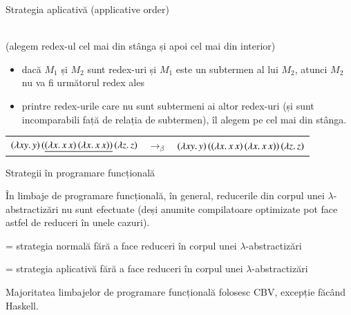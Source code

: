 \documentclass[xcolor=pdftex,romanian,colorlinks]{beamer}
\begin{document}
\begin{frame}[fragile]{Strategia aplicativă (applicative order)}

 \\
(alegem redex-ul  cel mai din stânga și apoi cel mai din interior)

\begin{itemize}
	\item dacă $M_1$ și $M_2$ sunt redex-uri  și $M_1$ este un subtermen al lui $M_2$, atunci $M_2$ {\color{False} nu} va fi următorul redex ales
	\item printre redex-urile care nu sunt subtermeni ai altor redex-uri (și sunt incomparabili față de relația de subtermen), îl alegem pe cel mai din stânga.
\end{itemize}

{\footnotesize
\begin{center}
\begin{tabular}{rcl} 
$(\lambda xy.\,y)\, (\underline{(\lambda x.\,x\, x)\, (\lambda x.\,x\, x))}\, (\lambda z.\,z)$ & $\rightarrow_\beta$ &  $(\lambda xy.\,y)\, ((\lambda x.\,x\, x)\, (\lambda x.\,x\, x))\, (\lambda z.\,z)$ \\
\end{tabular}
\end{center}
}

\end{frame}

\begin{frame}[fragile]{Strategii în programare funcțională}

În limbaje de programare funcțională, în general, reducerile din corpul unei $\lambda$-abstractizări nu sunt efectuate (deși anumite compilatoare optimizate pot face astfel de reduceri în unele cazuri).

\medskip
{} = strategia normală fără a face reduceri în corpul unei $\lambda$-abstractizări

\medskip
{} = strategia aplicativă fără a face reduceri în corpul unei $\lambda$-abstractizări

\medskip
Majoritatea limbajelor de programare funcțională folosesc CBV, excepție făcând Haskell.

\end{frame}
\end{document}
